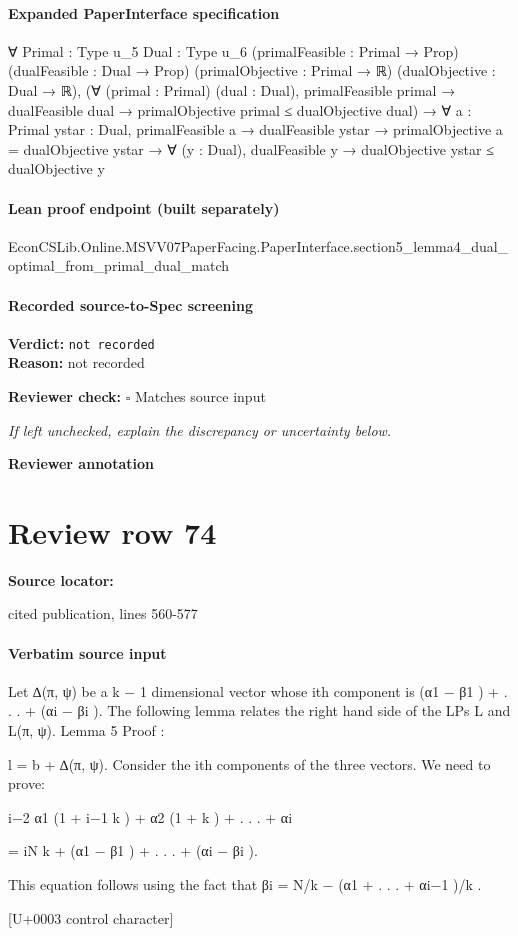 \documentclass[10pt]{article}
\newcommand{\reviewerbox}{%
  \par\noindent\fbox{\parbox{0.96\linewidth}{\rule{0pt}{0.38in}}}\par
}
\newcommand{\reviewmatch}[1]{%
  \par\noindent\textbf{Reviewer check:} $\square$\; #1\par
  \noindent\emph{If left unchecked, explain the discrepancy or uncertainty below.}\par
}
\begin{document}
\paragraph{Expanded PaperInterface specification}
\begin{ReviewVerbatim}
∀ {Primal : Type u_5} {Dual : Type u_6} (primalFeasible : Primal → Prop) (dualFeasible : Dual → Prop)
  (primalObjective : Primal → ℝ) (dualObjective : Dual → ℝ),
  (∀ (primal : Primal) (dual : Dual),
      primalFeasible primal → dualFeasible dual → primalObjective primal ≤ dualObjective dual) →
    ∀ {a : Primal} {ystar : Dual},
      primalFeasible a →
        dualFeasible ystar →
          primalObjective a = dualObjective ystar → ∀ (y : Dual), dualFeasible y → dualObjective ystar ≤ dualObjective y
\end{ReviewVerbatim}

\paragraph{Lean proof endpoint (built separately)}\begin{ReviewVerbatim}
EconCSLib.Online.MSVV07PaperFacing.PaperInterface.section5_lemma4_dual_optimal_from_primal_dual_match
\end{ReviewVerbatim}

\paragraph{Recorded source-to-Spec screening}
\textbf{Verdict:} \texttt{not recorded}
\\
\textbf{Reason:} not recorded
\reviewmatch{Matches source input}
\noindent\textbf{Reviewer annotation}\par
\reviewerbox
\clearpage
\hypertarget{source-claim-e20b0c2caf0c3c43}{}
\section*{Review row 74}
\textbf{Source locator:} {\footnotesize\raggedright cited publication, lines 560-\allowbreak{}577\par}
\paragraph{Verbatim source input}
\begin{ReviewVerbatim}
Let ∆(π, ψ) be a k − 1 dimensional vector whose ith component is (α1 − β1 ) + . . . + (αi − βi ).
The following lemma relates the right hand side of the LPs L and L(π, ψ).
Lemma 5
Proof :

l = b + ∆(π, ψ).
Consider the ith components of the three vectors. We need to prove:

i−2
α1 (1 + i−1
k ) + α2 (1 + k ) + . . . + αi

= iN
k + (α1 − β1 ) + . . . + (αi − βi ).

This equation follows using the fact that βi = N/k − (α1 + . . . + αi−1 )/k .

[U+0003 control character]
\end{ReviewVerbatim}
\end{document}
